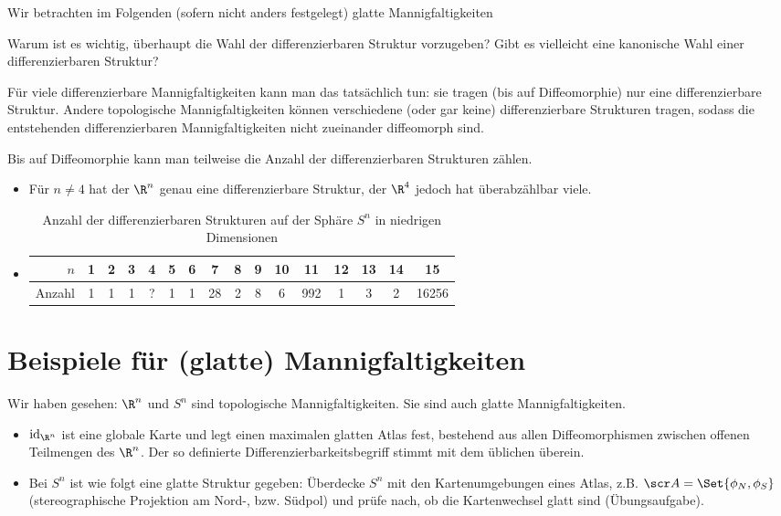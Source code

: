 \begin{conv*}
    Wir betrachten im Folgenden (sofern nicht anders festgelegt) glatte Mannigfaltigkeiten
\end{conv*}

Warum ist es wichtig, überhaupt die Wahl der differenzierbaren Struktur vorzugeben?
Gibt es vielleicht eine kanonische Wahl einer differenzierbaren Struktur?

Für viele differenzierbare Mannigfaltigkeiten kann man das tatsächlich tun:
sie tragen (bis auf Diffeomorphie) nur eine differenzierbare Struktur.
Andere topologische Mannigfaltigkeiten können verschiedene (oder gar keine) differenzierbare Strukturen tragen, sodass die entstehenden differenzierbaren Mannigfaltigkeiten nicht zueinander diffeomorph sind.

\begin{ex*}
    Bis auf Diffeomorphie kann man teilweise die Anzahl der differenzierbaren Strukturen zählen.
    \begin{itemize}
        \item
            Für $n \neq 4$ hat der $\R^n$ genau eine differenzierbare Struktur,
            der $\R^4$ jedoch hat überabzählbar viele.
        \item
            \begin{table}[ht]
                \begin{tabular}{r|ccccccccccccccc}
                    $n$ & 1 & 2 & 3 & 4 & 5 & 6 & 7 & 8 & 9 & 10 & 11 & 12 & 13 & 14 & 15 \\ \hline
                    Anzahl & 1 & 1 & 1 & ? & 1 & 1 & 28 & 2 & 8 & 6 & 992 & 1 & 3 & 2 & 16256
                \end{tabular}
                \caption{Anzahl der differenzierbaren Strukturen auf der Sphäre $S^n$ in niedrigen Dimensionen}
            \end{table}
    \end{itemize}
\end{ex*}


\section{Beispiele für (glatte) Mannigfaltigkeiten}


Wir haben gesehen: $\R^n$ und $S^n$ sind topologische Mannigfaltigkeiten.
Sie sind auch glatte Mannigfaltigkeiten.

\begin{itemize}
    \item
        $\id_{\R^n}$ ist eine globale Karte und legt einen maximalen glatten Atlas fest, bestehend aus allen Diffeomorphismen zwischen offenen Teilmengen des $\R^n$.
        Der so definierte Differenzierbarkeitsbegriff stimmt mit dem üblichen überein.
    \item
        Bei $S^n$ ist wie folgt eine glatte Struktur gegeben:
        Überdecke $S^n$ mit den Kartenumgebungen eines Atlas, z.B. $\scr A = \Set{\phi_N, \phi_S}$ (stereographische Projektion am Nord-, bzw. Südpol) und prüfe nach, ob die Kartenwechsel glatt sind (Übungsaufgabe).
\end{itemize}





